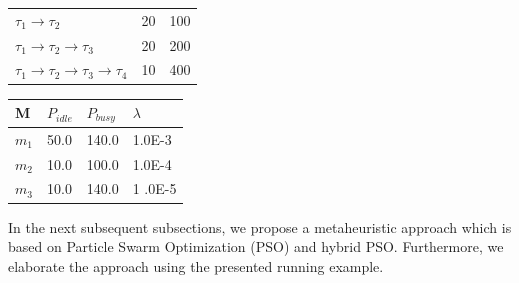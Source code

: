 \begin{center}
\begin{minipage}{.45\textwidth}
\begin{center}
\begin{tabular}{@{}lll@{}}
    $\tau_1\rightarrow\tau_2$ & 20  & 100\\
    $\tau_1\rightarrow\tau_2\rightarrow\tau_3$ & 20  & 200\\
    $\tau_1\rightarrow\tau_2\rightarrow\tau_3\rightarrow\tau_4$ & 10  & 400\\
    \bottomrule
    \end{tabular}
    \label{tbl_requirements}
\end{center}
\begin{center}
    \begin{tabular}{@{}llll@{}}
    \toprule
    M  & $P_{idle}$& $P_{busy}$& $\lambda$ \\ \midrule
    $m_1$ & 50.0& 140.0 &1.0E-3  \\
    $m_2$ & 10.0& 100.0 &1.0E-4  \\
    $m_3$ & 10.0& 140.0 &1 .0E-5 \\ \bottomrule
    \end{tabular}
    \label{tbl_nodes_specification}
\end{center}
\end{minipage}
\end{center}

In the next subsequent subsections, we propose a metaheuristic approach which is based on Particle Swarm Optimization (PSO) and hybrid PSO. Furthermore, we elaborate the approach using the presented running example.
